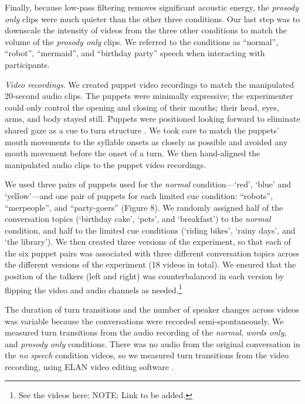 \documentclass[authoryear, 12pt]{elsarticle}
\begin{document}
Finally, because low-pass filtering removes significant acoustic energy, the \textit{prosody only} clips were much quieter than the other three conditions. Our last step was to downscale the intensity of videos from the three other conditions to match the volume of the \textit{prosody only} clips. We referred to the conditions as ``normal'', ``robot'', ``mermaid'', and ``birthday party'' speech when interacting with participants.

\textit{Video recordings}. We created puppet video recordings to match the manipulated 20-second audio clips. The puppets were minimally expressive; the experimenter could only control the opening and closing of their mouths; their head, eyes, arms, and body stayed still. Puppets were positioned looking forward to eliminate shared gaze as a cue to turn structure \citep{thorgrimssonUndRev}. We took care to match the puppets' mouth movements to the syllable onsets as closely as possible and avoided any mouth movement before the onset of a turn. We then hand-aligned the manipulated audio clips to the puppet video recordings.

We used three pairs of puppets used for the \textit{normal} condition---`red', `blue' and `yellow'---and one pair of puppets for each limited cue condition: ``robots'', ``merpeople'', and ``party-goers'' (Figure 8). We randomly assigned half of the conversation topics (`birthday cake', `pets', and `breakfast') to the \textit{normal} condition, and half to the limited cue conditions (`riding bikes', `rainy days', and `the library'). We then created three versions of the experiment, so that each of the six puppet pairs was associated with three different conversation topics across the different versions of the experiment (18 videos in total). We ensured that the position of the talkers (left and right) was counterbalanced in each version by flipping the video and audio channels as needed.\footnote{See the videos here: NOTE: Link to be added.}

The duration of turn transitions and the number of speaker changes across videos was variable because the conversations were recorded semi-spontaneously. We measured turn transitions from the audio recording of the \textit{normal}, \textit{words only}, and \textit{prosody only} conditions. There was no audio from the original conversation in the \textit{no speech} condition videos, so we measured turn transitions from the video recording, using ELAN video editing software \citep{ELAN}. 
\end{document}
